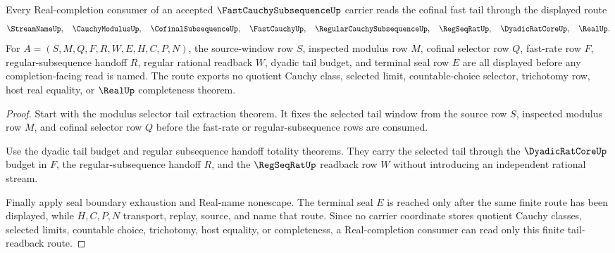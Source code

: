 \begin{theorem}
\label{thm:fast-cauchy-subsequence-real-completion-tail-readback-route}
Every Real-completion consumer of an accepted $\FastCauchySubsequenceUp$ carrier reads the cofinal fast tail through the displayed route
$$
\StreamNameUp,\quad \CauchyModulusUp,\quad \CofinalSubsequenceUp,\quad \FastCauchyUp,\quad \RegularCauchySubsequenceUp,\quad \RegSeqRatUp,\quad \DyadicRatCoreUp,\quad \RealUp .
$$
For $A=(S,M,Q,F,R,W,E,H,C,P,N)$, the source-window row $S$, inspected modulus row $M$, cofinal selector row $Q$, fast-rate row $F$, regular-subsequence handoff $R$, regular rational readback $W$, dyadic tail budget, and terminal seal row $E$ are all displayed before any completion-facing read is named. The route exports no quotient Cauchy class, selected limit, countable-choice selector, trichotomy row, host real equality, or $\RealUp$ completeness theorem.
\end{theorem}
\begin{proof}
Start with the modulus selector tail extraction theorem. It fixes the selected tail window from the source row $S$, inspected modulus row $M$, and cofinal selector row $Q$ before the fast-rate or regular-subsequence rows are consumed.

Use the dyadic tail budget and regular subsequence handoff totality theorems. They carry the selected tail through the $\DyadicRatCoreUp$ budget in $F$, the regular-subsequence handoff $R$, and the $\RegSeqRatUp$ readback row $W$ without introducing an independent rational stream.

Finally apply seal boundary exhaustion and Real-name nonescape. The terminal seal $E$ is reached only after the same finite route has been displayed, while $H,C,P,N$ transport, replay, source, and name that route. Since no carrier coordinate stores quotient Cauchy classes, selected limits, countable choice, trichotomy, host equality, or completeness, a Real-completion consumer can read only this finite tail-readback route.
\end{proof}

